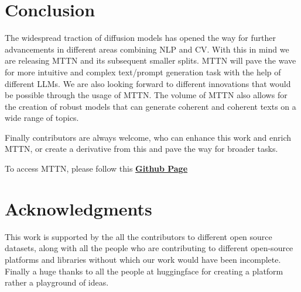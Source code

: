 \documentclass{article}
\begin{document}
\section{Conclusion}
The widespread traction of diffusion models\cite{DBLP:journals/corr/abs-2006-11239}\cite{DBLP:journals/corr/Sohl-DicksteinW15}\cite{DBLP:journals/corr/abs-1907-05600} has opened the way for further advancements in different areas combining NLP and CV. With this in mind we are releasing MTTN and its subsequent smaller splits. MTTN will pave the wave for more intuitive and complex text/prompt generation task with the help of different LLMs. We are also looking forward to different innovations that would be possible through the usage of MTTN. The volume of MTTN also allows for the creation of robust models that can generate coherent and coherent texts on a wide range of topics.

Finally contributors are always welcome, who can enhance this work and enrich MTTN, or create a derivative from this and pave the way for broader tasks.

To access MTTN, please follow this \underline{\textbf{\href{https://github.com/mttn2023/mttn}{Github Page}} }

\section*{Acknowledgments}
This work is supported by the all the contributors to different open source datasets, along with all the people who are contributing to different open-source platforms and libraries without which our work would have been incomplete.
Finally a huge thanks to all the people at huggingface\cite{wolf-etal-2020-transformers} for creating a platform rather a playground of ideas.
\\

  
  
\end{document}

